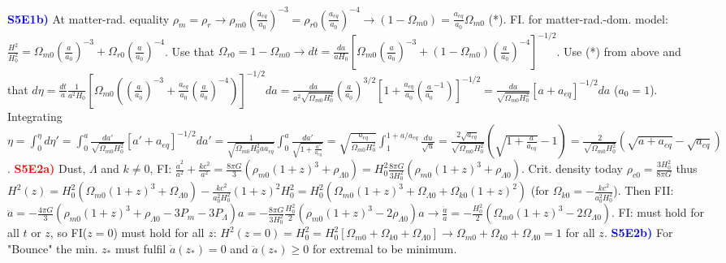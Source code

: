\documentclass[landscape, a4paper,1pt,english]{article}
\begin{document}
{{{\begin{multicols}{5}
\textcolor{blue}{\textbf{S5E1b)}} At matter-rad. equality $\rho_m = \rho_r\rightarrow \rho_{m0}\left(\frac{a_{eq}}{a_0}\right)^{-3}=\rho_{r0}\left(\frac{a_{eq}}{a_0}\right)^{-4}\rightarrow (1-\Omega_{m0}) = \frac{a_{eq}}{a_0}\Omega_{m0}$ (*). FI. for matter-rad.-dom. model: $\frac{H^2}{H_0^2} = \Omega_{m0}\left(\frac{a}{a_0}\right)^{-3} + \Omega_{r0}\left(\frac{a}{a_0}\right)^{-4}$. Use that $\Omega_{r0} =1-\Omega_{m0}\rightarrow dt=\frac{da}{aH_0}\left[\Omega_{m0}\left(\frac{a}{a_0}\right)^{-3} + \left(1-\Omega_{m0}\right)\left(\frac{a}{a_0}\right)^{-4}\right]^{-1/2}$. Use (*) from above and that $d\eta = \frac{dt}{a}\frac{1}{a^2H_0}\left[\Omega_{m0}\left(\left(\frac{a}{a_0}\right)^{-3} + \frac{a_{eq}}{a_0}\left(\frac{a}{a_0}\right)^{-4}\right)\right]^{-1/2}da = \frac{da}{a^2\sqrt{\Omega_{m0}H_0^2}}\left(\frac{a}{a_0}\right)^{3/2}\left[1+\frac{a_{eq}}{a_0}\left(\frac{a}{a_0}^{-1}\right)\right]^{-1/2} = \frac{da}{\sqrt{\Omega_{m0}H_0^2}}\left[a + a_{eq}\right]^{-1/2}da$ ($a_0 = 1$).  Integrating $\eta = \int_{0}^{\eta}d\eta' = \int_{0}^{a}\frac{da'}{\sqrt{\Omega_{m0}H_0^2}}\left[a'+a_{eq}\right]^{-1/2}da' = \frac{1}{\sqrt{\Omega_{m0}H_0^2aa_{eq}}}\int_{0}^{a}\frac{da'}{\sqrt{1+\frac{a'}{a_{eq}}}} = \sqrt{\frac{a_{eq}}{\Omega_{m0} H_0^2}}\int_{1}^{1+a/a_{eq}}\frac{du}{\sqrt{u}} = \frac{2\sqrt{a_{eq}}}{\sqrt{\Omega_{m0}H_0^2}}\left(\sqrt{1 + \frac{a}{a_{eq}}} - 1\right) = \frac{2}{\sqrt{\Omega_{m0}H_0^2}}\left(\sqrt{a + a_{eq}} - \sqrt{a_{eq}}\right)$.
\textcolor{red}{\textbf{S5E2a)}} Dust, $\Lambda$ and $k\neq0$, FI: $\frac{\dot{a}^2}{a^2} +\frac{kc^2}{a^2} = \frac{8\pi G}{3}\left(\rho_{m0}(1+z)^3 + \rho_{\Lambda0}\right) = H_0^2\frac{8\pi G}{3H_0^2}\left(\rho_{m0}(1+z)^3 + \rho_{\Lambda0}\right)$. Crit. density today $\rho_{c0} = \frac{3H_0^2}{8\pi G}$ thus $H^2(z) = H_0^2\left(\Omega_{m0}(1+z)^3 + \Omega_{\Lambda0}\right) - \frac{kc^2}{a_0^2H_0^2}(1+z)^2H_0^2 = H_0^2\left(\Omega_{m0}(1+z)^3 + \Omega_{\Lambda0} + \Omega_{k0}(1+z)^2\right)$ (for $\Omega_{k0} = -\frac{kc^2}{a_0^2H_0^2}$). Then FII: $\ddot{a} = -\frac{4\pi G}{3}\left(\rho_{m0}(1+z)^3 + \rho_{\Lambda0} - 3P_m - 3P_\Lambda\right)a = -\frac{8\pi G}{3H_0^2}\frac{H_0^2}{2}\left(\rho_{m0}(1+z)^3 - 2\rho_{\Lambda0}\right)a\rightarrow \frac{\ddot{a}}{a} = -\frac{H_0^2}{2}\left(\Omega_{m0}(1+z)^3 - 2\Omega_{\Lambda0}\right)$. FI: must hold for all $t$ or $z$, so FI($z = 0$) must hold for all $z$: $H^2(z=0) = H_0^2 = H_0^2\left[\Omega_{m0} + \Omega_{k0} + \Omega_{\Lambda0}\right]\rightarrow \Omega_{m0} + \Omega_{k0} + \Omega_{\Lambda0} = 1$ for all $z$.
\textcolor{blue}{\textbf{S5E2b)}} For "Bounce" the min. $z_*$ must fulfil $\dot{a}(z_*) = 0$ and $\ddot{a}(z_*)\geq 0$ for extremal to be minimum.

\end{multicols}}}}
\end{document}
